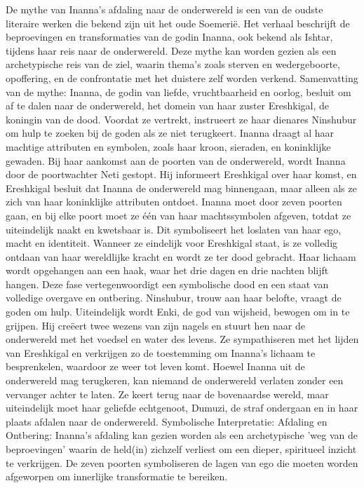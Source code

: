 De mythe van Inanna's afdaling naar de onderwereld is een van de oudste literaire werken die bekend zijn uit het oude Soemerië. Het verhaal beschrijft de beproevingen en transformaties van de godin Inanna, ook bekend als Ishtar, tijdens haar reis naar de onderwereld. Deze mythe kan worden gezien als een archetypische reis van de ziel, waarin thema's zoals sterven en wedergeboorte, opoffering, en de confrontatie met het duistere zelf worden verkend.
Samenvatting van de mythe:
Inanna, de godin van liefde, vruchtbaarheid en oorlog, besluit om af te dalen naar de onderwereld, het domein van haar zuster Ereshkigal, de koningin van de dood. Voordat ze vertrekt, instrueert ze haar dienares Ninshubur om hulp te zoeken bij de goden als ze niet terugkeert. Inanna draagt al haar machtige attributen en symbolen, zoals haar kroon, sieraden, en koninklijke gewaden.
Bij haar aankomst aan de poorten van de onderwereld, wordt Inanna door de poortwachter Neti gestopt. Hij informeert Ereshkigal over haar komst, en Ereshkigal besluit dat Inanna de onderwereld mag binnengaan, maar alleen als ze zich van haar koninklijke attributen ontdoet. Inanna moet door zeven poorten gaan, en bij elke poort moet ze één van haar machtssymbolen afgeven, totdat ze uiteindelijk naakt en kwetsbaar is. Dit symboliseert het loslaten van haar ego, macht en identiteit.
Wanneer ze eindelijk voor Ereshkigal staat, is ze volledig ontdaan van haar wereldlijke kracht en wordt ze ter dood gebracht. Haar lichaam wordt opgehangen aan een haak, waar het drie dagen en drie nachten blijft hangen. Deze fase vertegenwoordigt een symbolische dood en een staat van volledige overgave en ontbering.
Ninshubur, trouw aan haar belofte, vraagt de goden om hulp. Uiteindelijk wordt Enki, de god van wijsheid, bewogen om in te grijpen. Hij creëert twee wezens van zijn nagels en stuurt hen naar de onderwereld met het voedsel en water des levens. Ze sympathiseren met het lijden van Ereshkigal en verkrijgen zo de toestemming om Inanna’s lichaam te besprenkelen, waardoor ze weer tot leven komt.
Hoewel Inanna uit de onderwereld mag terugkeren, kan niemand de onderwereld verlaten zonder een vervanger achter te laten. Ze keert terug naar de bovenaardse wereld, maar uiteindelijk moet haar geliefde echtgenoot, Dumuzi, de straf ondergaan en in haar plaats afdalen naar de onderwereld.
Symbolische Interpretatie:
Afdaling en Ontbering: Inanna's afdaling kan gezien worden als een archetypische 'weg van de beproevingen' waarin de held(in) zichzelf verliest om een dieper, spiritueel inzicht te verkrijgen. De zeven poorten symboliseren de lagen van ego die moeten worden afgeworpen om innerlijke transformatie te bereiken.
